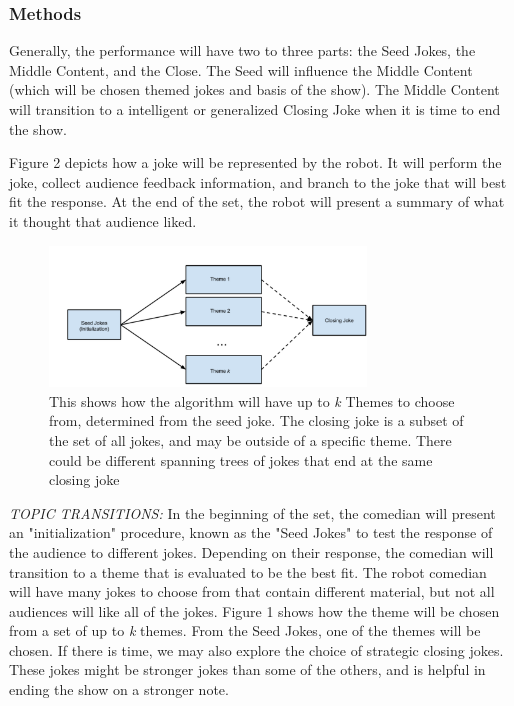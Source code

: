 \documentclass[onecolumn, draftclsnofoot,10pt, compsoc]{IEEEtran}
\begin{document}
\subsubsection{Methods}
Generally, the performance will have two to three parts: the Seed Jokes, the Middle Content, and the Close. The Seed will influence the Middle Content (which will be chosen themed jokes and basis of the show). The Middle Content will transition to a intelligent or generalized Closing Joke when it is time to end the show.

Figure 2 depicts how a joke will be represented by the robot. It will perform the joke, collect audience feedback information, and branch to the joke that will best fit the response. At the end of the set, the robot will present a summary of what it thought that audience liked.

\begin{figure}[H]
  \centering
  \includegraphics[width=0.75\textwidth,height=0.75\textheight,keepaspectratio]{fig0}
  \caption{This shows how the algorithm will have up to \textit{k} Themes to choose from, determined from the seed joke. The closing joke is a subset of the set of all jokes, and may be outside of a specific theme. There could be different spanning trees of jokes that end at the same closing joke}
\end{figure}

\textit{TOPIC TRANSITIONS: }In the beginning of the set, the comedian will present an "initialization" procedure, known as the "Seed Jokes" to test the response of the audience to different jokes. Depending on their response, the comedian will transition to a theme that is evaluated to be the best fit. The robot comedian will have many jokes to choose from that contain different material, but not all audiences will like all of the jokes. Figure 1 shows how the theme will be chosen from a set of up to \textit{k} themes. From the Seed Jokes, one of the themes will be chosen. If there is time, we may also explore the choice of strategic closing jokes. These jokes might be stronger jokes than some of the others, and is helpful in ending the show on a stronger note.
\end{document}
